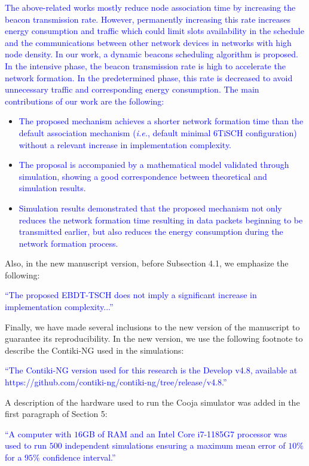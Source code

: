 \documentclass{article}
\newcommand{\textchange}[1]{\textcolor{blue}{#1}}
\begin{document}
\begin{enumerate}
\textchange{The above-related works mostly reduce node association time by increasing the beacon transmission rate. 
However, permanently increasing this rate increases energy consumption and traffic which could limit slots availability in the schedule and the communications between other network devices in networks with high node density. In our work, a dynamic beacons scheduling algorithm is proposed. In the intensive phase, the beacon transmission rate is high to accelerate the network formation. In the predetermined phase, this rate is decreased to avoid unnecessary traffic and corresponding energy consumption. The main contributions of our work are the following:}
\begin{itemize}
    \item \textchange{The proposed mechanism achieves a shorter network formation time than the default association mechanism (\textit{i.e.}, default minimal 6TiSCH configuration) without a relevant increase in implementation complexity.}
    \item \textchange{The proposal is accompanied by a mathematical model validated through simulation, showing a good correspondence between theoretical and simulation results.}
    \item \textchange{Simulation results demonstrated that the proposed mechanism not only reduces the network formation time resulting in data packets beginning to be transmitted earlier, but also reduces the energy consumption during the network formation process.}
\end{itemize}

Also, in the new manuscript version, before Subsection 4.1, we emphasize the following:

\textchange{``The proposed EBDT-TSCH does not imply a significant increase in implementation complexity...''}


Finally, we have made several inclusions to the new version of the manuscript to guarantee its reproducibility. In the new version, we use the following footnote to describe the Contiki-NG used in the simulations:

\textchange{``The Contiki-NG version used for this research is the Develop v4.8, available at https://github.com/contiki-ng/contiki-ng/tree/release/v4.8.''}

A description of the hardware used to run the Cooja simulator was added in the first paragraph of Section 5:

\textchange{``A computer with $16$GB of RAM and an Intel Core i7-1185G7 processor was used to run $500$ independent simulations ensuring a maximum mean error of $10\%$ for a $95\%$ confidence interval.''}


\end{enumerate}
\end{document}
